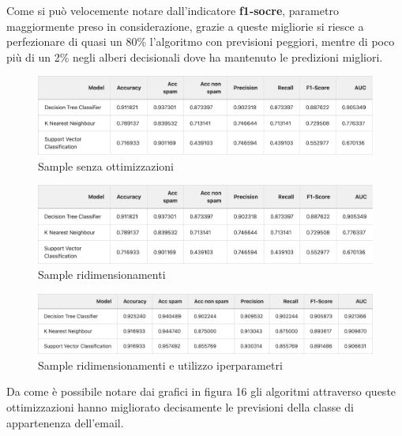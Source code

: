 \documentclass[12pt,a4paper]{article}
\begin{document}
Come si può velocemente notare dall'indicatore \textbf{f1-socre}, parametro maggiormente preso in considerazione, grazie a queste migliorie si riesce a perfezionare di quasi un 80\% l'algoritmo con previsioni peggiori, mentre di poco più di un 2\% negli alberi decisionali dove ha mantenuto le predizioni migliori.

\begin{figure}[H]
    \centering
    \includegraphics[width=1\linewidth]{results_0.png}
    \caption{Sample senza ottimizzazioni}
\end{figure}

\begin{figure}[H]
    \centering
    \includegraphics[width=1\linewidth]{results_1.png}
    \caption{Sample ridimensionamenti}
\end{figure}

\begin{figure}[H]
    \centering
    \includegraphics[width=1\linewidth]{results_2.png}
    \caption{Sample ridimensionamenti e utilizzo iperparametri}
\end{figure}

Da come è possibile notare dai grafici in figura 16 gli algoritmi attraverso queste ottimizzazioni hanno migliorato decisamente le previsioni della classe di appartenenza dell'email.
\end{document}
